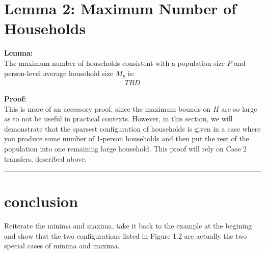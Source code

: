 \documentclass[
]{article}
\begin{document}
\hypertarget{lemma-2-maximum-number-of-households}{%
\section{Lemma 2: Maximum Number of
Households}\label{lemma-2-maximum-number-of-households}}

\textbf{Lemma:}\\
The maximum number of households consistent with a population size \(P\)
and person-level average household size \(M_p\) is: \begin{align}
TBD
\end{align}

\textbf{Proof:}\\
This is more of an accessory proof, since the maximum bounds on \(H\)
are so large as to not be useful in practical contexts. However, in this
section, we will demonstrate that the sparsest configuration of
households is given in a case where you produce some number of 1-person
households and then put the rest of the population into one remaining
large household. This proof will rely on Case 2 transfers, described
above.

\begin{center}\rule{0.5\linewidth}{0.5pt}\end{center}

\hypertarget{conclusion}{%
\section{conclusion}\label{conclusion}}

Reiterate the minima and maxima, take it back to the example at the
begining and show that the two configurations listed in Figure 1.2 are
actually the two special cases of minima and maxima.
\end{document}
